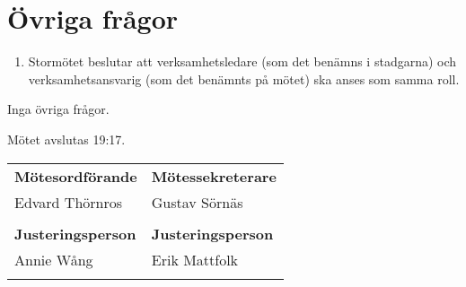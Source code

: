\documentclass[a4paper]{article}
\begin{document}
\section{Övriga frågor}

\begin{enumerate}
\def\labelenumi{\arabic{enumi}.}
\item Stormötet beslutar att verksamhetsledare (som det benämns i stadgarna)
och verksamhetsansvarig (som det benämnts på mötet) ska anses som samma roll.
\end{enumerate}

Inga övriga frågor.

Mötet avslutas 19:17.

\vspace{2em}

\begin{tabular}{@{}p{}p{}@{}}
  \textbf{Mötesordförande} & \textbf{Mötessekreterare} \\[0.3em]
  Edvard Thörnros & Gustav Sörnäs \\
  \vspace{8em} &\\
  \textbf{Justeringsperson} & \textbf{Justeringsperson} \\[0.3em]
  Annie Wång & Erik Mattfolk \\
  \vspace{8em} &\\
\end{tabular}
\end{document}
